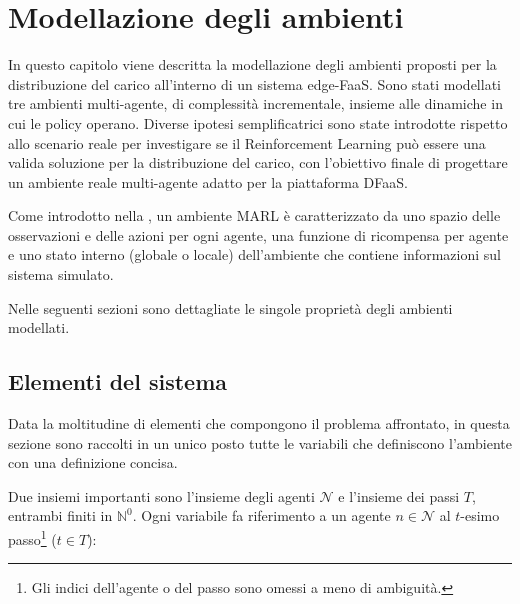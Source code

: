 \chapter{Modellazione degli ambienti}
\label{sec:4_modellazione}

In questo capitolo viene descritta la modellazione degli ambienti proposti per la distribuzione del carico all'interno di un sistema edge-FaaS. Sono stati modellati tre ambienti multi-agente, di complessità incrementale, insieme alle dinamiche in cui le policy operano. Diverse ipotesi semplificatrici sono state introdotte rispetto allo scenario reale per investigare se il Reinforcement Learning può essere una valida soluzione per la distribuzione del carico, con l'obiettivo finale di progettare un ambiente reale multi-agente adatto per la piattaforma DFaaS.

Come introdotto nella , un ambiente MARL è caratterizzato da uno spazio delle osservazioni e delle azioni per ogni agente, una funzione di ricompensa per agente e uno stato interno (globale o locale) dell'ambiente che contiene informazioni sul sistema simulato.

Nelle seguenti sezioni sono dettagliate le singole proprietà degli ambienti modellati.

\section{Elementi del sistema}
\label{sec:4_modellazione_elementi}

Data la moltitudine di elementi che compongono il problema affrontato, in questa sezione sono raccolti in un unico posto tutte le variabili che definiscono l'ambiente con una definizione concisa.

Due insiemi importanti sono l'insieme degli agenti $\mathcal{N}$ e l'insieme dei passi $T$, entrambi finiti in $\mathbb{N}^0$. Ogni variabile fa riferimento a un agente $n \in \mathcal{N}$ al $t$-esimo passo\footnote{Gli indici dell'agente o del passo sono omessi a meno di ambiguità.} ($t \in T$):


